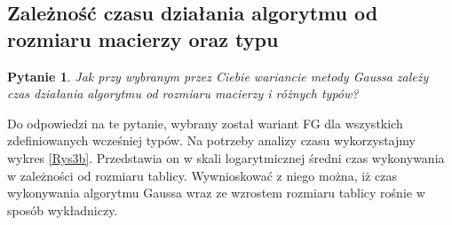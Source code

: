 \documentclass[10pt]{article}
\newtheorem{que}{Pytanie}
\begin{document}
\subsection{Zależność czasu działania algorytmu od rozmiaru macierzy oraz typu}
\begin{que}
	 Jak przy wybranym przez Ciebie wariancie metody Gaussa zależy czas działania
	algorytmu od rozmiaru macierzy i różnych typów?\label{que:2}
\end{que}
Do odpowiedzi na te pytanie, wybrany został wariant FG dla wszystkich zdefiniowanych wcześniej typów. Na potrzeby analizy czasu wykorzystajmy wykres \ref{Rys3b}. Przedstawia on w skali logarytmicznej średni czas wykonywania w zależności od rozmiaru tablicy. Wywnioskować z niego można, iż czas wykonywania algorytmu Gaussa wraz ze wzrostem rozmiaru tablicy rośnie w sposób wykładniczy.
\end{document}
